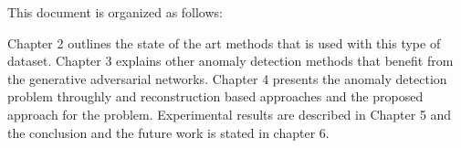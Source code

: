 
\begingroup
\text{\color{red}{Introduction will be written}}

\lipsum[1-3]

This document is organized as follows:

Chapter 2 outlines the state of the art methods that is used with this type of 
dataset. Chapter 3 explains other anomaly detection methods that benefit from the
generative adversarial networks. Chapter 4 presents the anomaly detection problem 
throughly and reconstruction based approaches and the proposed approach for the 
problem. Experimental results are described in Chapter 5 and the conclusion and 
the future work is stated in chapter 6.

\endgroup